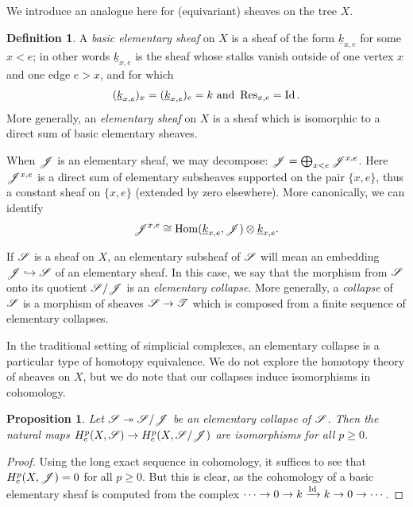 \documentclass[letter]{amsart}
\newtheorem{proposition}[thm]{Proposition}
\theoremstyle{definition}
\newtheorem{definition}[thm]{Definition}
\theoremstyle{remark}
\numberwithin{thm}{section}
\numberwithin{equation}{section}
\newcommand{\constsheaf}[1]{{\underline{#1}}}
\begin{document}
We introduce an analogue here for (equivariant) sheaves on the tree $X$.
\begin{definition}
A {\em basic elementary sheaf} on $X$ is a sheaf of the form $\constsheaf{k}_{x,e}$ for some $x < e$; in other words $\constsheaf{k}_{x,e}$ is the sheaf whose stalks vanish outside of one vertex $x$ and one edge $e > x$, and for which
$$(\constsheaf{k}_{x,e})_x = (\constsheaf{k}_{x,e})_e = k \text{ and } \Res_{x,e} = \Id.$$
More generally, an {\em elementary sheaf} on $X$ is a sheaf which is isomorphic to a direct sum of basic elementary sheaves.
\end{definition}

When ${\mathscr{J}}$ is an elementary sheaf, we may decompose:  ${\mathscr{J}} = \bigoplus_{x < e} {\mathscr{J}}^{x,e}$.  Here ${\mathscr{J}}^{x,e}$ is a direct sum of elementary subsheaves supported on the pair $\{ x,e \}$, thus a constant sheaf on $\{ x,e \}$ (extended by zero elsewhere).  More canonically, we can identify
$$\sheaf{J}^{x,e} \isom \Hom(\constsheaf{k}_{x,e}, \sheaf{J}) \otimes \constsheaf{k}_{x,e}.$$

If ${\mathscr{S}}$ is a sheaf on $X$, an elementary subsheaf of ${\mathscr{S}}$ will mean an embedding ${\mathscr{J}} \hookrightarrow {\mathscr{S}}$ of an elementary sheaf.  In this case, we say that the morphism from ${\mathscr{S}}$ onto its quotient ${\mathscr{S}} / {\mathscr{J}}$ is an {\em elementary collapse}.  More generally, a {\em collapse} of ${\mathscr{S}}$ is a morphism of sheaves ${\mathscr{S}} \rightarrow {\mathscr{T}}$ which is composed from a finite sequence of elementary collapses.

In the traditional setting of simplicial complexes, an elementary collapse is a particular type of homotopy equivalence.  We do not explore the homotopy theory of sheaves on $X$, but we do note that our collapses induce isomorphisms in cohomology.
\begin{proposition}
Let ${\mathscr{S}} \twoheadrightarrow {\mathscr{S}} / {\mathscr{J}}$ be an elementary collapse of ${\mathscr{S}}$.  Then the natural maps $H_c^p(X, {\mathscr{S}}) \rightarrow H_c^p(X, {\mathscr{S}} / {\mathscr{J}})$ are isomorphisms for all $p \geq 0$.
\end{proposition}
\begin{proof}
Using the long exact sequence in cohomology, it suffices to see that $H_c^p(X, {\mathscr{J}}) = 0$ for all $p \geq 0$.  But this is clear, as the cohomology of a basic elementary sheaf is computed from the complex $\cdots \rightarrow 0 \rightarrow k \xrightarrow{\operatorname{Id}} k \rightarrow 0 \rightarrow \cdots$.  
\end{proof}
\end{document}
